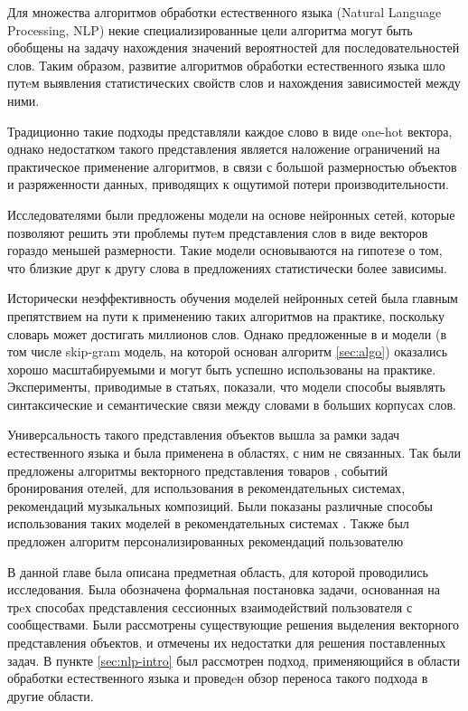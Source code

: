 \documentclass[times,specification,annotation]{itmo-student-thesis}
\begin{document}
Для множества алгоритмов обработки естественного языка (Natural Language Processing, NLP) некие специализированные цели алгоритма могут быть обобщены на задачу нахождения значений вероятностей для последовательностей слов.
Таким образом, развитие алгоритмов обработки естественного языка шло путeм выявления статистических свойств слов и нахождения зависимостей между ними.

Традиционно такие подходы представляли каждое слово в виде one-hot вектора, однако недостатком такого представления является наложение ограничений на практическое применение алгоритмов, в связи с большой размерностью объектов и разряженности данных, приводящих к ощутимой потери производительности.

Исследователями были предложены модели на основе нейронных сетей\cite{turian2010}, которые позволяют решить эти проблемы путeм представления слов в виде векторов гораздо меньшей размерности. Такие модели основываются на гипотезе о том, что близкие друг к другу слова в предложениях статистически более зависимы.

Исторически неэффективность обучения моделей нейронных сетей была главным препятствием на пути к применению таких алгоритмов на практике, поскольку словарь может достигать миллионов слов. Однако предложенные в \cite{mikolov2013efficient} и \cite{mikolov2013distributed} модели (в том числе skip-gram модель, на которой основан алгоритм \ref{sec:algo}) оказались хорошо масштабируемыми и могут быть успешно использованы на практике. Эксперименты, приводимые в статьях, показали, что модели способы выявлять синтаксические и семантические связи между словами в больших корпусах слов. 

Универсальность такого представления объектов вышла за рамки задач естественного языка и была применена в областях, с ним не связанных. Так были предложены алгоритмы векторного представления товаров \cite{grbovic2015commerce}\cite{Vasile2016}, событий бронирования отелей\cite{airbnb}, для использования в рекомендательных системах, рекомендаций музыкальных композиций\cite{cheng2017exploiting}. Были показаны различные способы использования таких моделей в рекомендательных системах \cite{ozsoy2016word}. Также был предложен алгоритм персонализированных рекомендаций пользователю \cite{manotumruksa2016modelling}

\chapterconclusion

В данной главе была описана предметная область, для которой проводились исследования. Была обозначена формальная постановка задачи, основанная на трeх способах представления сессионных взаимодействий пользователя с сообществами. Были рассмотрены существующие решения выделения векторного представления объектов, и отмечены их недостатки для решения поставленных задач. В пункте \ref{sec:nlp-intro} был рассмотрен подход, применяющийся в области обработки естественного языка и проведeн обзор переноса такого подхода в другие области.   
\end{document}
